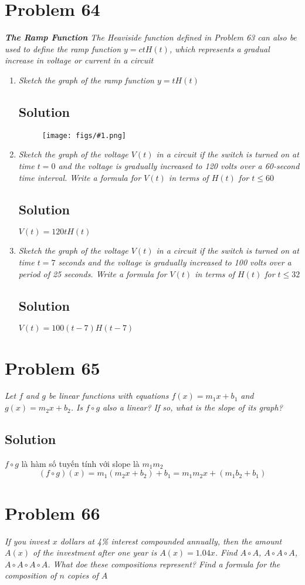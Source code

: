 \documentclass[11pt]{article}
\newcommand{\soln}{\subsection*}
\newcommand{\qn}{\textit}
\newcommand{\imgsoln}[1]{
	\begin{figure}[H]
		\centering
		\texttt{[image: figs/\#1.png]}
	\end{figure}
}
\begin{document}
\section*{Problem 64}

\qn{\textbf{The Ramp Function} The Heaviside function defined in Problem 63 can also be used to define the ramp function $y=ctH(t)$, which represents a gradual increase in voltage or current in a circuit}

\begin{enumerate}
	\item \qn{Sketch the graph of the ramp function $y=tH(t)$}
	\soln{Solution}
	\imgsoln{1.3.64-ans.a}
	
	\item \qn{Sketch the graph of the voltage $V(t)$ in a circuit if the switch is turned on at time $t=0$ and the voltage is gradually increased to 120 volts over a 60-second time interval. Write a formula for $V(t)$ in terms of $H(t)$ for $t \le 60$}
	\soln{Solution}
	$V(t)=120tH(t)$
	
	\item \qn{Sketch the graph of the voltage $V(t)$ in a circuit if the switch is turned on at time $t=7$ seconds and the voltage is gradually increased to 100 volts over a period of 25 seconds. Write a formula for $V(t)$ in terms of $H(t)$ for $t \le 32$}
	\soln{Solution}
	$V(t)=100(t-7)H(t-7)$
\end{enumerate}

\section*{Problem 65}

\qn{Let $f$ and $g$ be linear functions with equations $f(x)=m_1x+b_1$ and $g(x)=m_2x+b_2$. Is $f \circ g$ also a linear? If so, what is the slope of its graph?}

\soln{Solution}
$f \circ g$ là hàm số tuyến tính với slope là $m_1m_2$
$$(f \circ g)(x)=m_1(m_2x+b_2)+b_1=m_1m_2x+(m_1b_2+b_1)$$

\section*{Problem 66}

\qn{If you invest $x$ dollars at 4\% interest compounded annually, then the amount $A(x)$ of the investment after one year is $A(x)=1.04x$. Find $A \circ A$, $A \circ A \circ A$, $A \circ A \circ A \circ A$. What doe these compositions represent? Find a formula for the composition of $n$ copies of $A$}
\end{document}
